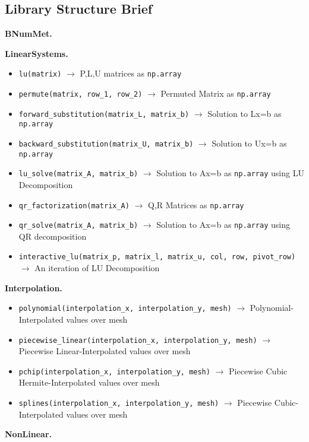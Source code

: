 \subsection*{Library Structure Brief}
\textbf{BNumMet.}

\textbf{LinearSystems.}

\begin{itemize}
\item \texttt{lu(matrix)} $\rightarrow$ P,L,U matrices as \texttt{np.array}
\item \texttt{permute(matrix, row\_1, row\_2)} $\rightarrow$ Permuted Matrix as \texttt{np.array}
\item \texttt{forward\_substitution(matrix\_L, matrix\_b)} $\rightarrow$ Solution to Lx=b as \texttt{np.array}
\item \texttt{backward\_substitution(matrix\_U, matrix\_b)} $\rightarrow$ Solution to Ux=b as \texttt{np.array}
\item \texttt{lu\_solve(matrix\_A, matrix\_b)} $\rightarrow$ Solution to Ax=b as \texttt{np.array} using LU Decomposition
\item \texttt{qr\_factorization(matrix\_A)} $\rightarrow$ Q,R Matrices as \texttt{np.array}
\item \texttt{qr\_solve(matrix\_A, matrix\_b)} $\rightarrow$ Solution to Ax=b as \texttt{np.array} using QR decomposition
\item \texttt{interactive\_lu(matrix\_p, matrix\_l, matrix\_u, col, row, pivot\_row)} $\rightarrow$ An iteration of LU Decomposition
\end{itemize}

\textbf{Interpolation.}

\begin{itemize}
\item \texttt{polynomial(interpolation\_x, interpolation\_y, mesh)} $\rightarrow$ Polynomial-Interpolated values over mesh
\item \texttt{piecewise\_linear(interpolation\_x, interpolation\_y, mesh)} $\rightarrow$ Piecewise Linear-Interpolated values over mesh
\item \texttt{pchip(interpolation\_x, interpolation\_y, mesh)} $\rightarrow$ Piecewise Cubic Hermite-Interpolated values over mesh
\item \texttt{splines(interpolation\_x, interpolation\_y, mesh)} $\rightarrow$ Piecewise Cubic-Interpolated values over mesh
\end{itemize}

\textbf{NonLinear.}

